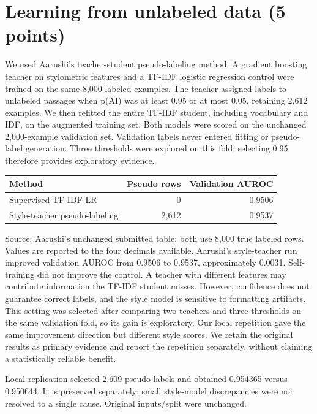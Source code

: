 \section{Learning from unlabeled data (5 points)}
We used Aarushi's teacher-student pseudo-labeling method. A gradient boosting teacher on stylometric features and a TF-IDF logistic regression control were trained on the same 8,000 labeled examples. The teacher assigned labels to unlabeled passages when p(AI) was at least 0.95 or at most 0.05, retaining 2,612 examples. We then refitted the entire TF-IDF student, including vocabulary and IDF, on the augmented training set. Both models were scored on the unchanged 2,000-example validation set. Validation labels never entered fitting or pseudo-label generation. Three thresholds were explored on this fold; selecting 0.95 therefore provides exploratory evidence.

\begin{center}\begin{tabular}{@{}lrr@{}}
\toprule Method & Pseudo rows & Validation AUROC \\ \midrule
Supervised TF-IDF LR & 0 & 0.9506 \\
Style-teacher pseudo-labeling & 2,612 & 0.9537 \\
\bottomrule\end{tabular}\end{center}
{\small Source: Aarushi's unchanged submitted table; both use 8,000 true labeled rows. Values are reported to the four decimals available.}
Aarushi's style-teacher run improved validation AUROC from 0.9506 to 0.9537, approximately 0.0031. Self-training did not improve the control. A teacher with different features may contribute information the TF-IDF student misses. However, confidence does not guarantee correct labels, and the style model is sensitive to formatting artifacts. This setting was selected after comparing two teachers and three thresholds on the same validation fold, so its gain is exploratory. Our local repetition gave the same improvement direction but different style scores. We retain the original results as primary evidence and report the repetition separately, without claiming a statistically reliable benefit.

{\small Local replication selected 2,609 pseudo-labels and obtained 0.954365 versus 0.950644. It is preserved separately; small style-model discrepancies were not resolved to a single cause. Original inputs/split were unchanged.}
